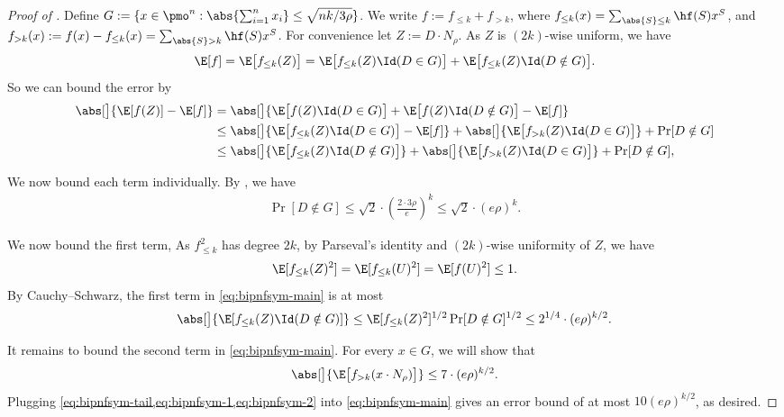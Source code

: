 \begin{proof}[Proof of ]
  Define $G := \{ x \in \pmo^n: \abs{\sum_{i=1}^n x_i} \le \sqrt{nk/3\rho} \}$.
  We write $f := f_{\le k} + f_{>k}$, where $f_{\le k}(x) = \sum_{\abs{S}\le k} \hf(S) x^S$, and $f_{>k}(x) := f(x) - f_{\le k}(x) = \sum_{\abs{S} > k} \hf(S) x^S$.
  For convenience let $Z:= D \cdot N_\rho$.
  As $Z$ is $(2k)$-wise uniform, we have
  \begin{align*}
      \E [f] = \E\bigl[f_{\le k}(Z) \bigr]  = \E\bigl[f_{\le k}(Z) \Id (D\in G) \bigr] +  \E\bigl[f_{\le k}(Z) \Id (D\notin G) \bigr].
  \end{align*}
  So we can bound the error by
  \begin{align}
    \abs[\big]{ \E[f(Z)] - \E[f] }
    &=  \abs[\big]{ \E\bigl[f(Z) \Id(D \in G) \bigr] +\E\bigl[f(Z) \Id( D\notin G)\bigr] - \E[f]  } \nonumber  \\
    &\le \abs[\big]{ \E\bigl[f_{\le k}(Z) \Id(D \in G)\bigr] - \E[f]  } +\abs[\big]{\E\bigl[f_{>k}(Z) \Id(D \in G)\bigr]} + \Pr [D \notin G] \nonumber \\
    &\le \abs[\big]{ \E\bigl[f_{\le k}(Z) \Id(D \notin G) \bigr]  }  + \abs[\big]{\E\bigl[f_{>k}(Z) \Id(D \in G)\bigr]} + \Pr[D \notin G] \label{eq:bipnfsym-main} ,
  \end{align}

  We now bound each term individually.
  By , we have
  \begin{align} \label{eq:bipnfsym-tail}
    \Pr[ D \not\in G ]
    \le \sqrt{2} \cdot \left( \frac{2 \cdot 3\rho}{e} \right)^k 
    \le \sqrt{2} \cdot (e\rho)^k .
  \end{align}

  We now bound the first term, 
  As $f_{\le k}^2$ has degree $2k$, by Parseval's identity and $(2k)$-wise uniformity of $Z$, we have
  \[
    \E[f_{\le k}(Z)^2]
    = \E[f_{\le k}(U)^2]
    = \E[f(U)^2]
    \le 1 .
  \]
  By Cauchy--Schwarz, the first term in \cref{eq:bipnfsym-main} is at most
  \begin{align} \label{eq:bipnfsym-1}
    \abs[\big]{ \E[f_{\le k}(Z) \Id (D\notin G) ]  }
    \le \E[f_{\leq k}(Z)^2 ]^{1/2} \Pr[D \notin G]^{1/2}
    \le 2^{1/4} \cdot (e \rho)^{k/2} .
  \end{align}

  It remains to bound the second term in \cref{eq:bipnfsym-main}.
  For every $x \in G$,  we will show that
  \begin{align} \label{eq:bipnfsym-2}
    \abs[\big]{\E\bigl[f_{>k}(x \cdot N_\rho)\bigr]}
    \le 7 \cdot (e\rho)^{k/2} .
  \end{align}
  Plugging \cref{eq:bipnfsym-tail,eq:bipnfsym-1,eq:bipnfsym-2} into \cref{eq:bipnfsym-main} gives an error bound of at most $10 (e\rho)^{k/2}$, as desired.


\end{proof}
